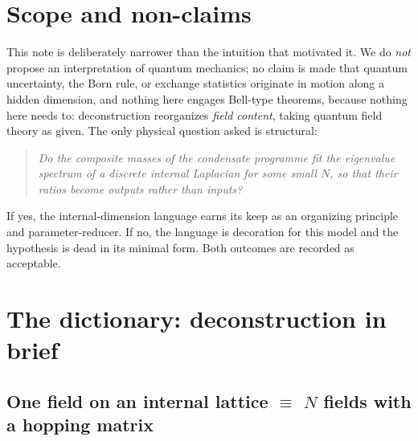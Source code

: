 \documentclass[11pt,a4paper]{article}
\begin{document}
\section{Scope and non-claims}
\label{sec:scope}

This note is deliberately narrower than the intuition that
motivated it.
We do \emph{not} propose an interpretation of quantum mechanics;
no claim is made that quantum uncertainty, the Born rule, or
exchange statistics originate in motion along a hidden dimension,
and nothing here engages Bell-type theorems, because nothing here
needs to: deconstruction reorganizes \emph{field content}, taking
quantum field theory as given.
The only physical question asked is structural:

\begin{quote}
\emph{Do the composite masses of the condensate programme fit the
eigenvalue spectrum of a discrete internal Laplacian for some
small $N$, so that their ratios become outputs rather than
inputs?}
\end{quote}

If yes, the internal-dimension language earns its keep as an
organizing principle and parameter-reducer.
If no, the language is decoration for this model and the
hypothesis is dead in its minimal form.
Both outcomes are recorded as acceptable.

\section{The dictionary: deconstruction in brief}
\label{sec:dict}

\subsection{One field on an internal lattice $\equiv$ $N$ fields
with a hopping matrix}
\end{document}
